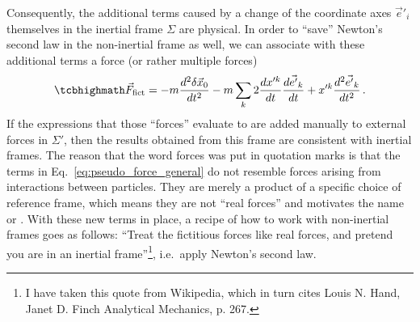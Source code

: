 \documentclass[../class_mech_main.tex]{subfiles}
\begin{document}
Consequently, the additional terms caused by a change of the coordinate axes $\vec{e}'_i$ themselves in the inertial frame $\Sigma$ are physical. In order to \enquote{save} Newton's second law in the non-inertial frame as well, we can associate with these additional terms a force (or rather multiple forces)
\begin{equation}\label{eq:pseudo_force_general}
	\eqbox{
		\vec{F}_\mathrm{fict} = - m \dv[2]{\delta \vec{x}_0}{t} - m \sum_k 2 \dv{x'^k}{t} \dv{\vec{e'}_k}{t} + x'^k \dv[2]{\vec{e'}_k}{t}
	}	\, .
\end{equation}
If the expressions that those \enquote{forces} evaluate to are added manually to external forces in $\Sigma'$, then the results obtained from this frame are consistent with inertial frames. The reason that the word forces was put in quotation marks is that the terms in Eq.~\eqref{eq:pseudo_force_general} do not resemble forces arising from interactions between particles. They are merely a product of a specific choice of reference frame, which means they are not \enquote{real forces} and motivates the name  or . With these new terms in place, a recipe of how to work with non-inertial frames goes as follows: \enquote{Treat the fictitious forces like real forces, and pretend you are in an inertial frame}\footnote{I have taken this quote from Wikipedia, which in turn cites Louis N. Hand, Janet D. Finch Analytical Mechanics, p. 267.}, i.e.~apply Newton's second law.
\end{document}
